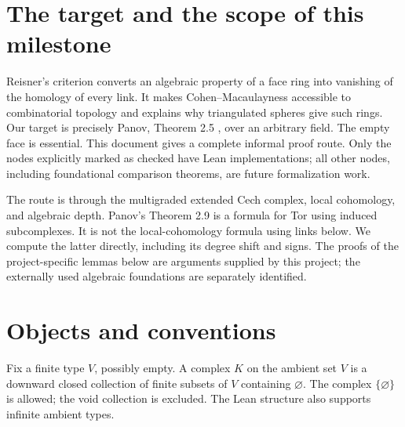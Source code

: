 \section{The target and the scope of this milestone}

Reisner's criterion converts an algebraic property of a face ring into
vanishing of the homology of every link. It makes Cohen--Macaulayness
accessible to combinatorial topology and explains why triangulated spheres
give such rings. Our target is precisely Panov, Theorem 2.5
\cite{panov}, over an arbitrary field. The empty face is essential.
This document gives a complete informal proof route. Only the nodes explicitly
marked as checked have Lean implementations; all other nodes, including
foundational comparison theorems, are future formalization work.

The route is through the multigraded extended Cech complex, local cohomology,
and algebraic depth. Panov's Theorem 2.9 is a formula for Tor using induced
subcomplexes. It is not the local-cohomology formula using links below.
We compute the latter directly, including its degree shift and signs.
The proofs of the project-specific lemmas below are arguments supplied by this
project; the externally used algebraic foundations are separately identified.

\section{Objects and conventions}

\begin{definition}\label{def:complex}
\leanok
Fix a finite type $V$, possibly empty. A complex $K$ on the ambient set $V$
is a downward closed collection of finite subsets of $V$ containing
$\varnothing$. The complex $\{\varnothing\}$ is allowed; the void collection
is excluded. The Lean structure also supports infinite ambient types.
\end{definition}


